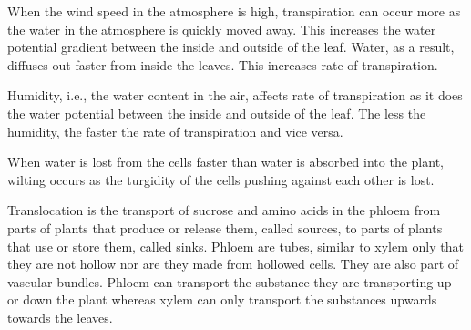 When the wind speed in the atmosphere is high, transpiration can occur more as the water in the
atmosphere is quickly moved away. This increases the water potential gradient between the inside
and outside of the leaf. Water, as a result, diffuses out faster from inside the leaves. This
increases rate of transpiration.

Humidity, i.e., the water content in the air, affects rate of transpiration as it does the water
potential between the inside and outside of the leaf. The less the humidity, the faster the 
rate of transpiration and vice versa.

When water is lost from the cells faster than water is absorbed into the plant, wilting occurs
as the turgidity of the cells pushing against each other is lost.

Translocation is the transport of sucrose and amino acids in the phloem from parts of plants that
produce or release them, called sources, to parts of plants that use or store them, called sinks.
Phloem are tubes, similar to xylem only that they are not hollow nor are they made from hollowed
cells. They are also part of vascular bundles. Phloem can transport the substance they are 
transporting up or down the plant whereas xylem can only transport the substances upwards towards
the leaves.

